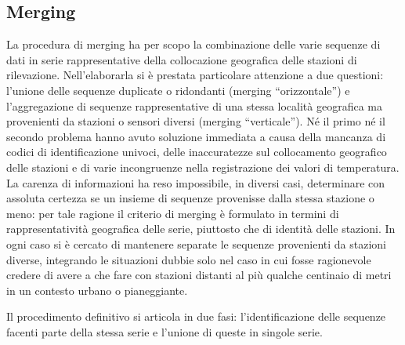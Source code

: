 \subsection{Merging}\label{ch:merging}
La procedura di merging ha per scopo la combinazione delle varie sequenze di dati in serie rappresentative della collocazione geografica delle stazioni di rilevazione. Nell'elaborarla si è prestata particolare attenzione a due questioni: l'unione delle sequenze duplicate o ridondanti (merging ``orizzontale'') e l'aggregazione di sequenze rappresentative di una stessa località geografica ma provenienti da stazioni o sensori diversi (merging ``verticale''). Né il primo né il secondo problema hanno avuto soluzione immediata a causa della mancanza di codici di identificazione univoci, delle inaccuratezze sul collocamento geografico delle stazioni e di varie incongruenze nella registrazione dei valori di temperatura. La carenza di informazioni ha reso impossibile, in diversi casi, determinare con assoluta certezza se un insieme di sequenze provenisse dalla stessa stazione o meno: per tale ragione il criterio di merging è formulato in termini di rappresentatività geografica delle serie, piuttosto che di identità delle stazioni. In ogni caso si è cercato di mantenere separate le sequenze provenienti da stazioni diverse, integrando le situazioni dubbie solo nel caso in cui fosse ragionevole credere di avere a che fare con stazioni distanti al più qualche centinaio di metri in un contesto urbano o pianeggiante.

Il procedimento definitivo si articola in due fasi: l'identificazione delle sequenze facenti parte della stessa serie e l'unione di queste in singole serie.

